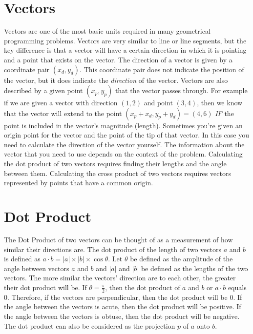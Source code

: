 \documentclass[10pt]{book}
\begin{document}
\section{Vectors}

Vectors are one of the most basic units required in many geometrical programming problems. Vectors are very similar to line or line segments, but the key difference is that a vector will have a certain direction in which it is pointing and a point that exists on the vector. The direction of a vector is given by a coordinate pair $(x_{d},y_{d})$. This coordinate pair does not indicate the position of the vector, but it does indicate the \emph{direction} of the vector. Vectors are also described by a given point $(x_{p}, y_{p})$ that the vector passes through. For example if we are given a vector with direction $(1,2)$ and point $(3,4)$, then we know that the vector will extend to the point $(x_{p}+x_{d},y_{p}+y_{d}) = (4,6)$ \emph{IF} the point is included in the vector's magnitude (length). Sometimes you're given an origin point for the vector and the point of the tip of that vector. In this case you need to calculate the direction of the vector yourself. The information about the vector that you need to use depends on the context of the problem. Calculating the dot product of two vectors requires finding their lengths and the angle between them. Calculating the cross product of two vectors requires vectors represented by points that have a common origin.

               

\section{Dot Product}

The Dot Product of two vectors can be thought of as a measurement of how similar their directions are. The dot product of the length of two vectors $a$ and $b$ is defined as $a \cdot b = |a| \times |b| \times \cos{\theta}$. Let $\theta$ be defined as the amplitude of the angle between vectors $a$ and $b$ and $|a|$ and $|b|$ be defined as the lengths of the two vectors. The more similar the vectors' direction are to each other, the greater their dot product will be. If $\theta = \frac{\pi}{2}$, then the dot product of $a$ and $b$ or $a \cdot b$ equals 0. Therefore, if the vectors are perpendicular, then the dot product will be 0. If the angle between the vectors is acute, then the dot product will be positive. If the angle between the vectors is obtuse, then the dot product will be negative. The dot product can also be considered as the projection $p$ of $a$ onto $b$.
\end{document}
